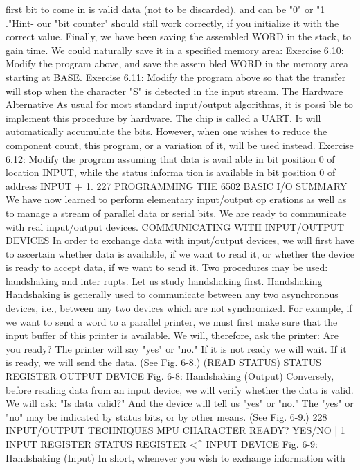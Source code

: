 \documentclass{book}
\begin{document}
first bit to come in is valid data (not to be discarded), and can be
"0" or "1 ."Hint- our "bit counter" should still work correctly,
if you initialize it with the correct value.
Finally, we have been saving the assembled WORD in the stack, to
gain time. We could naturally save it in a specified memory area:
Exercise 6.10: Modify the program above, and save the assem
bled WORD in the memory area starting at BASE.
Exercise 6.11: Modify the program above so that the transfer
will stop when the character "S" is detected in the input stream.
The Hardware Alternative
As usual for most standard input/output algorithms, it is possi
ble to implement this procedure by hardware. The chip is called a
UART. It will automatically accumulate the bits. However, when
one wishes to reduce the component count, this program, or a
variation of it, will be used instead.
Exercise 6.12: Modify the program assuming that data is avail
able in bit position 0 of location INPUT, while the status informa
tion is available in bit position 0 of address INPUT + 1.
227
PROGRAMMING THE 6502
BASIC I/O SUMMARY
We have now learned to perform elementary input/output op
erations as well as to manage a stream of parallel data or serial
bits. We are ready to communicate with real input/output devices.
COMMUNICATING WITH INPUT/OUTPUT DEVICES
In order to exchange data with input/output devices, we will
first have to ascertain whether data is available, if we want to
read it, or whether the device is ready to accept data, if we want to
send it. Two procedures may be used: handshaking and inter
rupts. Let us study handshaking first.
Handshaking
Handshaking is generally used to communicate between any
two asynchronous devices, i.e., between any two devices which
are not synchronized. For example, if we want to send a word to a
parallel printer, we must first make sure that the input buffer of
this printer is available. We will, therefore, ask the printer: Are
you ready? The printer will say "yes" or "no." If it is not ready we
will wait. If it is ready, we will send the data. (See Fig. 6-8.)
(READ
STATUS)
STATUS
REGISTER
OUTPUT
DEVICE
Fig. 6-8: Handshaking (Output)
Conversely, before reading data from an input device, we will
verify whether the data is valid. We will ask: "Is data valid?" And
the device will tell us "yes" or "no." The "yes" or "no" may be
indicated by status bits, or by other means. (See Fig. 6-9.)
228
INPUT/OUTPUT TECHNIQUES
MPU
CHARACTER
READY?
YES/NO
| 1
INPUT
REGISTER
STATUS
REGISTER
<^
INPUT
DEVICE
Fig. 6-9: Handshaking (Input)
In short, whenever you wish to exchange information with
\end{document}

